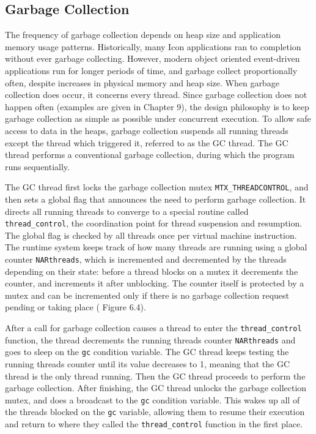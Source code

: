 \subsection{Garbage Collection}

The frequency of garbage collection depends on heap size and application
memory usage patterns.  Historically, many Icon applications ran to
completion without ever garbage collecting. However, modern object oriented
event-driven applications run for longer periods of time, and garbage
collect proportionally often, despite increases in physical memory and heap
size. When garbage collection does occur, it concerns every thread.  Since
garbage collection does not happen often (examples are given in
{\color{red} Chapter 9}), the design philosophy is to keep garbage
collection as simple as possible under concurrent execution.  To allow safe
access to data in the heaps, garbage collection suspends all running
threads except the thread which triggered it, referred to as the GC
thread. The GC thread performs a conventional garbage collection, during
which the program runs sequentially.


The GC thread first locks the garbage collection mutex
\texttt{MTX\_THREADCONTROL}, and then sets a global flag that announces the
need to perform garbage collection. It directs all running threads to
converge to a special routine called \texttt{thread\_control}, the
coordination point for thread suspension and resumption. The global flag is
checked by all threads once per virtual machine instruction.  The runtime
system keeps track of how many threads are running using a global counter
\texttt{NARthreads}, which is incremented and decremented by the threads
depending on their state: before a thread blocks on a mutex it decrements
the counter, and increments it after unblocking. The counter itself is
protected by a mutex and can be incremented only if there is no garbage
collection request pending or taking place ({\color{red} Figure 6.4}).

After a call for garbage collection causes a thread to enter the
\texttt{thread\_control} function, the thread decrements the running
threads counter \texttt{NARthreads} and goes to sleep on the \texttt{gc}
condition variable. The GC thread keeps testing the running threads counter
until its value decreases to 1, meaning that the GC thread is the only
thread running. Then the GC thread proceeds to perform the garbage
collection. After finishing, the GC thread unlocks the garbage collection
mutex, and does a broadcast to the \texttt{gc} condition variable. This
wakes up all of the threads blocked on the \texttt{gc} variable, allowing
them to resume their execution and return to where they called the
\texttt{thread\_control} function in the first place.

